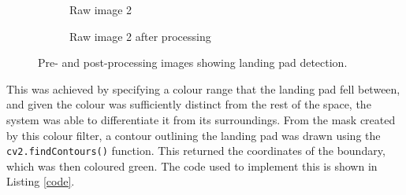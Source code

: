 \begin{figure}[H]
\begin{subfigure}[t]{.5\textwidth}
  \caption{Raw image 2}
\end{subfigure}%
\begin{subfigure}[t]{.5\textwidth}
  \centering
  \caption{Raw image 2 after processing}
\end{subfigure}
\caption{Pre- and post-processing images showing landing pad detection.}
\label{fig:landing_detection}
\end{figure}

This was achieved by specifying a colour range that the landing pad fell between, and given the colour was sufficiently distinct from the rest of the space, the system was able to differentiate it from its surroundings. From the mask created by this colour filter, a contour outlining the landing pad was drawn using the \texttt{cv2.findContours()} function. This returned the coordinates of the boundary, which was then coloured green. The code used to implement this is shown in Listing \ref{code}.

